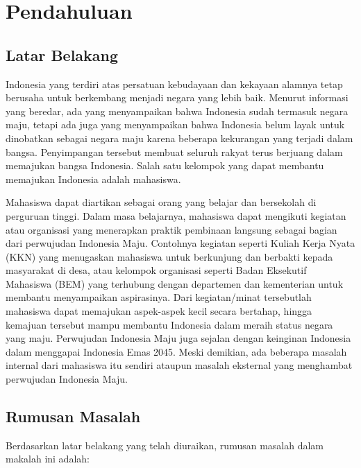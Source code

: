 \chapter{Pendahuluan}


\section{Latar Belakang}

Indonesia yang terdiri atas persatuan kebudayaan dan kekayaan alamnya tetap berusaha untuk berkembang menjadi negara yang lebih baik. Menurut informasi yang beredar, ada yang menyampaikan bahwa Indonesia sudah termasuk negara maju, tetapi ada juga yang menyampaikan bahwa Indonesia belum layak untuk dinobatkan sebagai negara maju karena beberapa kekurangan yang terjadi dalam bangsa. Penyimpangan tersebut membuat seluruh rakyat terus berjuang dalam memajukan bangsa Indonesia. Salah satu kelompok yang dapat membantu memajukan Indonesia adalah mahasiswa.

Mahasiswa dapat diartikan sebagai orang yang belajar dan bersekolah di perguruan tinggi. Dalam masa belajarnya, mahasiswa dapat mengikuti kegiatan atau organisasi yang menerapkan praktik pembinaan langsung sebagai bagian dari perwujudan Indonesia Maju. Contohnya kegiatan seperti Kuliah Kerja Nyata (KKN) yang menugaskan mahasiswa untuk berkunjung dan berbakti kepada masyarakat di desa, atau kelompok organisasi seperti Badan Eksekutif Mahasiswa (BEM) yang terhubung dengan departemen dan kementerian untuk membantu menyampaikan aspirasinya. Dari kegiatan/minat tersebutlah mahasiswa dapat memajukan aspek-aspek kecil secara bertahap, hingga kemajuan tersebut mampu membantu Indonesia dalam meraih status negara yang maju. Perwujudan Indonesia Maju juga sejalan dengan keinginan Indonesia dalam menggapai Indonesia Emas 2045. Meski demikian, ada beberapa masalah internal dari mahasiswa itu sendiri ataupun masalah eksternal yang menghambat perwujudan Indonesia Maju.

\section{Rumusan Masalah}

Berdasarkan latar belakang yang telah diuraikan, rumusan masalah dalam makalah ini adalah:

